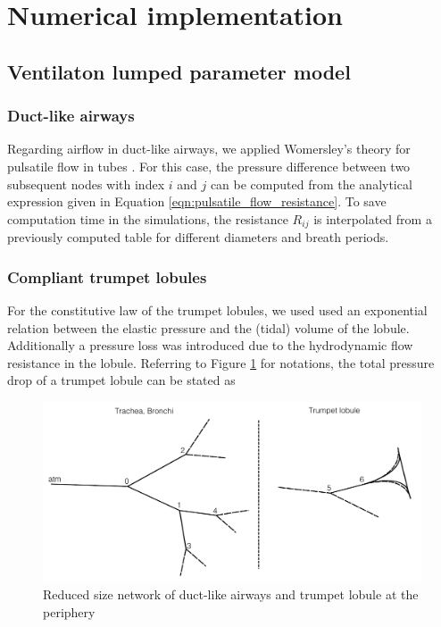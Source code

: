 \section{Numerical implementation} \label{sec:numerical_implementation}

\subsection{Ventilaton lumped parameter model} \label{ssec:ventilation}
\subsubsection{Duct-like airways}
Regarding airflow in duct-like airways, we applied Womersley's theory for pulsatile flow in tubes \citep{Womersley1957}.
For this case, the pressure difference between two subsequent nodes with index $i$ and $j$ can be computed from the analytical expression given in Equation \ref{eqn:pulsatile_flow_resistance}.
To save computation time in the simulations, the resistance $R_{ij}$ is interpolated from a previously computed table for different diameters and breath periods.

\subsubsection{Compliant trumpet lobules}
For the constitutive law of the trumpet lobules, we used used an exponential relation between the elastic pressure and the (tidal) volume of the lobule.
Additionally a pressure loss was introduced due to the hydrodynamic flow resistance in the lobule.
Referring to Figure \ref{fig:network} for notations, the total pressure drop of a trumpet lobule can be stated as

\begin{figure}[b!]
\centering
\includegraphics[width=\textwidth]{figures/network}
\caption{Reduced size network of duct-like airways and trumpet lobule at the periphery}
\label{fig:network}
\end{figure}

